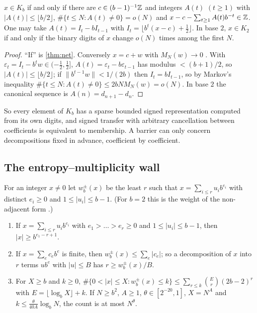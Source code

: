 \documentclass[11pt]{article}
\newcommand{\dist}[1]{\lVert #1\rVert}
\newcommand{\cnt}{\#}
\begin{document}
\begin{theorem}[Completeness]\label{thm:completeness}
$x\in K_b$ if and only if there are $c\in(b-1)^{-1}\mathbb Z$ and integers $A(t)$ $(t\ge1)$ with
$|A(t)|\le\lfloor b/2\rfloor$, $\cnt\{t\le N:A(t)\ne0\}=o(N)$ and
$x-c-\sum_{t\ge1}A(t)b^{-t}\in\mathbb Z$. One may take $A(t)=I_t-bI_{t-1}$ with
$I_t=\lfloor b^t(x-c)+\frac12\rfloor$. In base $2$, $x\in K_2$ if and only if the binary digits of $x$
change $o(N)$ times among the first $N$.
\end{theorem}

\begin{proof}
``If'' is \cref{thm:net}. Conversely $x=c+w$ with $M_N(w)\to0$ \cite{DiscrepancyCompanion}. With
$\varepsilon_t=I_t-b^tw\in(-\frac12,\frac12]$, $A(t)=\varepsilon_t-b\varepsilon_{t-1}$ has modulus
$<(b+1)/2$, so $|A(t)|\le\lfloor b/2\rfloor$; if $\dist{b^{t-1}w}<1/(2b)$ then $I_t=bI_{t-1}$, so by
Markov's inequality $\cnt\{t\le N:A(t)\ne0\}\le2bNM_N(w)=o(N)$. In base $2$ the canonical sequence is
$A(n)=d_{n+1}-d_n$.
\end{proof}

So every element of $K_b$ has a sparse bounded signed representation computed from its own digits,
and signed transfer with arbitrary cancellation between coefficients is equivalent to membership.
A barrier can only concern decompositions fixed in advance, coefficient by coefficient.

\subsection{The entropy--multiplicity wall}\label{subsec:wall}

For an integer $x\ne0$ let $w_b^\pm(x)$ be the least $r$ such that $x=\sum_{i\le r}u_ib^{e_i}$ with
distinct $e_i\ge0$ and $1\le|u_i|\le b-1$. (For $b=2$ this is the weight of the non-adjacent form
\cite{Reitwiesner1960}.)

\begin{lemma}\label{lem:entropy}
\leavevmode
\begin{enumerate}[label=\textup{(\alph*)},nosep]
\item If $x=\sum_{i\le r}u_ib^{e_i}$ with $e_1>\dots>e_r\ge0$ and $1\le|u_i|\le b-1$, then
$|x|\ge b^{e_1-r+1}$.
\item If $x=\sum_ec_eb^e$ is finite, then $w_b^\pm(x)\le\sum_e|c_e|$; so a decomposition of $x$ into
$r$ terms $ub^e$ with $|u|\le B$ has $r\ge w_b^\pm(x)/B$.
\item For $X\ge b$ and $k\ge0$, $\cnt\{0<|x|\le X:w_b^\pm(x)\le k\}\le\sum_{r\le k}\binom Er(2b-2)^r$
with $E=\lfloor\log_bX\rfloor+k$. If $N\ge b^2$, $A\ge1$, $\theta\in[2^{-20},1]$, $X=N^A$ and
$k\le\frac\theta{40A}\log_bN$, the count is at most $N^\theta$.
\end{enumerate}
\end{lemma}
\end{document}
